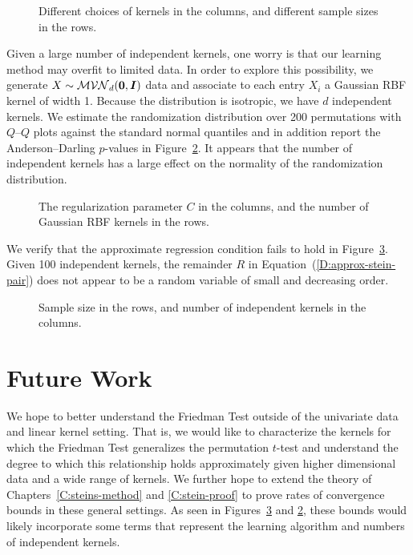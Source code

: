 \begin{figure}
  \begin{center}
    \resizebox{14.0cm}{!}{
      
    }
  \end{center}
\caption{Different choices of kernels in the columns, and different
  sample sizes in the rows.}
\label{fig:mkl_arc}
\end{figure}

Given a large number of independent kernels, one worry is that our
learning method may overfit to limited data.  In order to explore this
possibility, we generate $X \sim \mathcal{MVN}_d({\bf 0}, {\boldsymbol I})$
data and associate to each entry $X_i$ a Gaussian RBF kernel of width
1.  Because the distribution is isotropic, we have $d$ independent
kernels.  We estimate the randomization distribution over 200
permutations with $Q$--$Q$ plots against the standard normal quantiles
and in addition report the Anderson--Darling $p$-values
in Figure~\ref{fig:overfit_mkl}.  It appears that the number of
independent kernels has a large effect on the normality of the
randomization distribution.

\begin{figure}
  \begin{center}
    \resizebox{14.0cm}{!}{
      
    }
  \end{center}
\caption{The regularization parameter $C$ in the columns, and the
  number of Gaussian RBF kernels in the rows.}
\label{fig:overfit_mkl}
\end{figure}

We verify that the approximate regression condition fails to hold in
Figure~\ref{fig:mkl_arc_overfit}.  Given 100 independent kernels, the
remainder $R$ in Equation~(\ref{D:approx-stein-pair}) does not
appear to be a random variable of small and decreasing order.

\begin{figure}
  \begin{center}
    \resizebox{14.0cm}{!}{
      
    }
  \end{center}
\caption{Sample size in the rows, and number of independent kernels in
the columns.}
\label{fig:mkl_arc_overfit}
\end{figure}

\section{Future Work}
We hope to better understand the Friedman Test outside of the
univariate data and linear kernel setting.  That is, we would like to
characterize the kernels for which the Friedman Test generalizes the
permutation $t$-test and understand the degree to which this
relationship holds approximately given higher dimensional data and a
wide range of kernels.  We further hope to extend the theory of
Chapters~\ref{C:steins-method} and \ref{C:stein-proof} to prove rates
of convergence bounds in these general settings.  As seen in
Figures~\ref{fig:mkl_arc_overfit} and \ref{fig:overfit_mkl}, these bounds
would likely incorporate some terms that represent the learning
algorithm and numbers of independent kernels.

